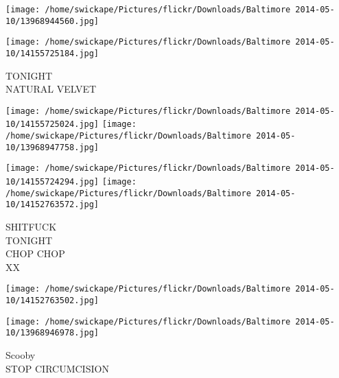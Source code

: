 \documentclass[10pt,letterpaper]{article}
\begin{document}
\texttt{[image: /home/swickape/Pictures/flickr/Downloads/Baltimore 2014-05-10/13968944560.jpg]}

\vspace{0.25in}
\texttt{[image: /home/swickape/Pictures/flickr/Downloads/Baltimore 2014-05-10/14155725184.jpg]}

TONIGHT\\
NATURAL VELVET
\pagebreak

\texttt{[image: /home/swickape/Pictures/flickr/Downloads/Baltimore 2014-05-10/14155725024.jpg]}
\texttt{[image: /home/swickape/Pictures/flickr/Downloads/Baltimore 2014-05-10/13968947758.jpg]}

\texttt{[image: /home/swickape/Pictures/flickr/Downloads/Baltimore 2014-05-10/14155724294.jpg]}
\texttt{[image: /home/swickape/Pictures/flickr/Downloads/Baltimore 2014-05-10/14152763572.jpg]}

SHITFUCK\\
TONIGHT\\
CHOP CHOP\\
XX
\pagebreak

\texttt{[image: /home/swickape/Pictures/flickr/Downloads/Baltimore 2014-05-10/14152763502.jpg]}

\vspace{0.25in}
\texttt{[image: /home/swickape/Pictures/flickr/Downloads/Baltimore 2014-05-10/13968946978.jpg]}

Scooby\\
STOP CIRCUMCISION
\pagebreak
\end{document}
